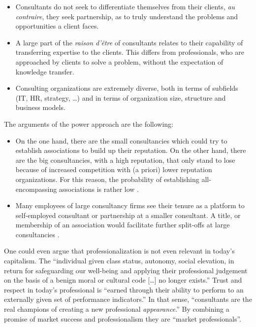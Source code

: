 \documentclass[12pt]{article}
\begin{document}
\begin{itemize}
\item
  Consultants do not seek to differentiate themselves from their
  clients, \emph{au contraire}, they seek partnership, as to truly
  understand the problems and opportunities a client faces.
  \citep{fincham2006}
\item
  A large part of the \emph{raison d'être} of consultants relates to
  their capability of transferring expertise to the clients. This
  differs from professionals, who are approached by clients to solve a
  problem, without the expectation of knowledge transfer.
  \citep{oakley1993}
\item
  Consulting organizations are extremely diverse, both in terms of
  subfields (IT, HR, strategy, \ldots) and in terms of organization
  size, structure and business models. \citep[ 79, 89]{kieser2006}
\end{itemize}

The arguments of the power approach are the following:

\begin{itemize}
\item
  On the one hand, there are the small consultancies which could try to
  establish associations to build up their reputation. On the other
  hand, there are the big consultancies, with a high reputation, that
  only stand to lose because of increased competition with (a priori)
  lower reputation organizations. For this reason, the probability of
  establishing all-encompassing associations is rather low \citep[
  77]{kieser2006}.
\item
  Many employees of large consultancy firms see their tenure as a
  platform to self-employed consultant or partnership at a smaller
  consultant. A title, or membership of an association would facilitate
  further split-offs at large consultancies \citep[ 80]{kieser2006}.
\end{itemize}

One could even argue that professionalization is not even relevant in
today's capitalism. The ``individual given class status, autonomy,
social elevation, in return for safeguarding our well-being and applying
their professional judgement on the basis of a benign moral or cultural
code {[}\ldots{]} no longer exists.'' \citep[1-2]{dent2013} Trust and
respect in today's professional is ``earned through their ability to
perform to an externally given set of performance indicators.'' In that
sense, ``consultants are the real champions of creating a new
professional \emph{appearance}.'' \citep[ 95]{kieser2006} By combining a
promise of market success and professionalism they are ``market
professionals''.
\end{document}
